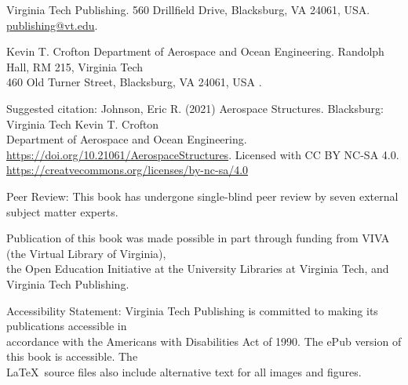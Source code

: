 \documentclass{AeroStructure-ERJohnson}
\begin{document}
\begin{copyrt}
Virginia Tech Publishing. 560 Drillfield Drive, Blacksburg, VA 24061,
USA. \url{publishing@vt.edu}.

Kevin T. Crofton Department of Aerospace and Ocean Engineering.
Randolph Hall, RM 215, Virginia Tech\\
460 Old Turner Street, Blacksburg, VA 24061, USA .

Suggested citation: Johnson, Eric R. (2021) {Aerospace
Structures}. Blacksburg: Virginia Tech Kevin T. Crofton\\
Department of Aerospace and Ocean Engineering. \url{https://doi.org/10.21061/AerospaceStructures}.
Licensed with CC BY NC-SA 4.0.
\url{https://creatvecommons.org/licenses/by-nc-sa/4.0}

Peer Review: This book has undergone single-blind peer review by seven external subject matter experts.

Publication of this book was made possible in part through funding
from VIVA (the Virtual Library of Virginia),\\
the Open Education Initiative at the University Libraries
at Virginia Tech, and Virginia Tech Publishing.

Accessibility Statement: Virginia Tech Publishing is committed to
making its publications accessible in\\
accordance with the Americans with Disabilities Act of 1990. The ePub
version of this book is accessible. The\\
\LaTeX\ source files also include alternative text for all images and figures.


\end{copyrt}
\end{document}
